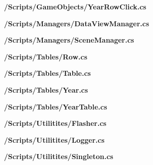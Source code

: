 \textbf{/Scripts/GameObjects/YearRowClick.cs}

\clearpage

\textbf{/Scripts/Managers/DataViewManager.cs}

\clearpage

\textbf{/Scripts/Managers/SceneManager.cs}

\clearpage

\textbf{/Scripts/Tables/Row.cs}

\clearpage

\textbf{/Scripts/Tables/Table.cs}

\clearpage

\textbf{/Scripts/Tables/Year.cs}

\clearpage

\textbf{/Scripts/Tables/YearTable.cs}

\clearpage

\textbf{/Scripts/Utilitites/Flasher.cs}

\clearpage

\textbf{/Scripts/Utilitites/Logger.cs}

\clearpage

\textbf{/Scripts/Utilitites/Singleton.cs}


